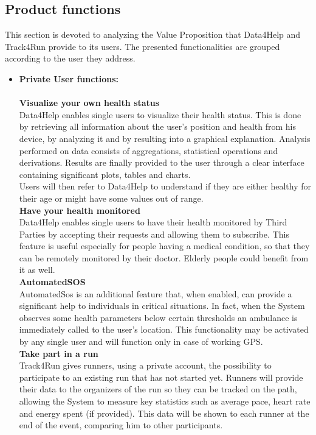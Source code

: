 \documentclass[titlepage]{article}
\begin{document}
	\subsection{Product functions}
	This section is devoted to analyzing the Value Proposition that Data4Help and Track4Run provide to its users. The presented functionalities are grouped according to the user they address.\\
	
	\begin{itemize}
	\item{\bf Private User functions:}\\
	\\
	{\bf Visualize your own health status} \\
Data4Help enables single users to visualize their health status. This is done by retrieving all information about the user’s position and health from his device, by analyzing it and by resulting into a graphical explanation. Analysis performed on data consists of aggregations, statistical operations and derivations. Results are finally provided to the user through a clear interface containing significant plots, tables and charts.\\
Users will then refer to Data4Help to understand if they are either healthy for their age or might have some values out of range. \\

{\bf Have your health monitored} \\
Data4Help enables single users to have their health monitored by Third Parties by accepting their requests and allowing them to subscribe. This feature is useful especially for people having a medical condition, so that they can be remotely monitored by their doctor. Elderly people could benefit from it as well.\\

{\bf AutomatedSOS}\\
AutomatedSos is an additional feature that, when enabled, can provide a significant help to individuals in critical situations. In fact, when the System observes some health parameters below certain thresholds an ambulance is immediately called to the user’s location. This functionality may be activated by any single user and will function only in case of working GPS.\\

{\bf Take part in a run} \\
Track4Run gives runners, using a private account, the possibility to participate to an existing run that has not started yet. Runners will provide their data to the organizers of the run so they can be tracked on the path, allowing the System to measure key statistics such as average pace, heart rate and energy spent (if provided). This data will be shown to each runner at the end of the event, comparing him to other participants.\\


\end{itemize}
\end{document}
